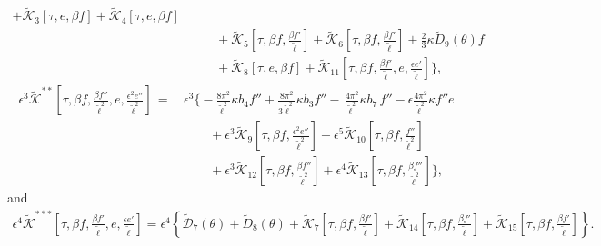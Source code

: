 \documentclass[10pt, reqno]{amsart}
\numberwithin{equation}{section}
\theoremstyle{definition}
\begin{document}
{\begin{align*}
 + \tilde{\mathcal K}_3\left[\tau, e, {\beta f}\right]
 + \tilde{\mathcal K}_4\left[\tau, e, {\beta f}\right]
\nonumber\\[2mm]
 &  \qquad
 + \tilde{\mathcal K}_5\left[\tau, \beta{ f}, \frac{\beta{f}'}{\tilde\ell}\right]
 + \tilde{\mathcal K}_6\left[\tau, \beta{ f}, \frac{\beta{f}'}{\tilde\ell}\right]
 + \frac{2}{3} \kappa \tilde {D}_9 (\theta) f
\nonumber\\[2mm]
 &  \qquad
 + \tilde{\mathcal K}_8\left[\tau, e, {\beta f}\right]
 +\tilde{\mathcal K}_{11}\left[\tau, \beta f, \frac{\beta {f}'}{\tilde\ell}, e, \frac{\epsilon e'}{\tilde\ell}\right]
 \Bigg\},
\end{align*}
\begin{align*}
\epsilon^3 \tilde{\mathcal K}^{**} \left[\tau, \beta f, \frac{\beta f''}{\tilde\ell^2}, e,  \frac{\epsilon^2 e''}{\tilde \ell^2}\right]
\,=\, &
\epsilon^3\Bigg\{
  -\frac{8\pi^2}{{\tilde\ell}^2} \kappa b_4  f''
+ \frac{8\pi^2}{3\tilde \ell^2} \kappa b_3f''
 - \,\frac{4\pi^2}{{\tilde\ell}^2}\kappa b_7\,f''
- \epsilon \frac{ 4\pi^2} {{\tilde\ell}^2} \kappa  f'' e
\nonumber\\[2mm]
 & \qquad
  + {\epsilon^3} \tilde{\mathcal K}_9 \left[\tau, \beta f, \frac{\epsilon^2 e''}{\tilde \ell^2}\right]+ \epsilon^5 \tilde{\mathcal K}_{10} \left[\tau, \beta f, \frac{f''}{\tilde \ell^2}\right]
  \nonumber\\[2mm]
 & \qquad + \epsilon^3\tilde{\mathcal K}_{12}\left[\tau, \beta f, \frac{\beta f''}{\tilde\ell^2}\right]
 +\epsilon^4\tilde{\mathcal K}_{13}\left[\tau, \beta f, \frac{\beta f''}{\tilde\ell^2}\right]
 \Bigg\},
\end{align*}
and
\begin{align*}
\epsilon^4 \tilde{\mathcal K}^{***} \left[\tau, \beta f, \frac{\beta {f}'}{\tilde\ell}, e, \frac{\epsilon e'}{\tilde\ell}\right]
 = \epsilon^4 \left\{\tilde{\mathcal D}_7(\theta)
 +\tilde {D}_8 (\theta)
 + \tilde{\mathcal K}_7\left[\tau, \beta{ f}, \frac{\beta{f}'}{\tilde\ell}\right]
 + \tilde{\mathcal K}_{14}\left[\tau, \beta f, \frac{\beta f'}{\tilde\ell}\right]
 + \tilde{\mathcal K}_{15}\left[\tau, \beta f, \frac{\beta {f}'}{\tilde\ell}\right] \right\}.
\end{align*}


}
\end{document}
